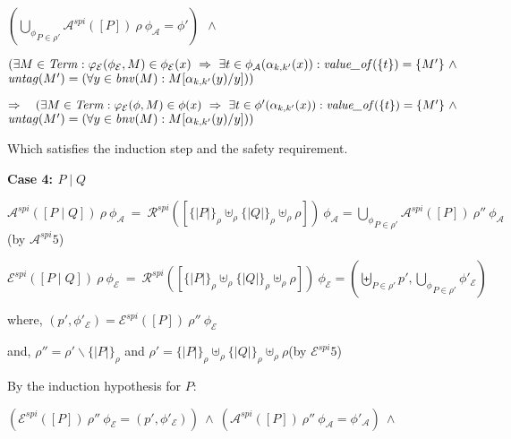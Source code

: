 \documentclass[10pt,a4paper,final,oneside,fleqn]{book}
\begin{document}
\noindent
$(\underset{P\in\rho'}{\bigcup_\phi}\mathcal{A}^{spi}(\![P]\!)~\rho~\phi_\mathcal{A}=\phi')~~\wedge$

\noindent
$(\exists M\in\mbox{{\itshape Term\/}}:\varphi_\mathcal{E}(\phi_\mathcal{E},M)\in\phi_\mathcal{E}(x)~\Rightarrow~\exists t\in\phi_\mathcal{A}(\alpha_{k,k'}(x)):\mbox{{\itshape value\_of\/}}(\{t\})=\{M'\}~\wedge$\\
$\mbox{{\itshape untag\/}}(M')=(\forall y\in\mbox{{\itshape bnv\/}}(M):M[\alpha_{k,k'}(y)/y]))$\vspace{5mm}

\noindent
$\Rightarrow~~~(\exists M\in\mbox{{\itshape Term\/}}:\varphi_\mathcal{E}(\phi,M)\in\phi(x)~\Rightarrow~\exists t\in\phi'(\alpha_{k,k'}(x)): \mbox{{\itshape value\_of\/}}(\{t\})=\{M'\}~\wedge$\\
$\mbox{{\itshape untag\/}}(M')=(\forall y\in\mbox{{\itshape bnv\/}}(M):M[\alpha_{k,k'}(y)/y]))$\vspace{5mm}

\noindent
Which satisfies the induction step and the safety requirement.\vspace{5mm}

\noindent
{\bf Case 4: $P\mid Q$}

\noindent
$\mathcal{A}^{spi}(\![P\mid Q]\!)~\rho~\phi_\mathcal{A}~=~\mathcal{R}^{spi}(\![\{\!|P|\!\}_\rho\uplus_\rho\{\!|Q|\!\}_\rho\uplus_\rho\rho]\!)~\phi_\mathcal{A}=\underset{P\in\rho'}{\bigcup_\phi}\mathcal{A}^{spi}(\![P]\!)~\rho''~\phi_\mathcal{A}$\hfill(by $\mathcal{A}^{{spi}}5$)

\noindent
$\mathcal{E}^{spi}(\![P\mid Q]\!)~\rho~\phi_\mathcal{E}~=~\mathcal{R}^{spi}(\![\{\!|P|\!\}_\rho\uplus_\rho\{\!|Q|\!\}_\rho\uplus_\rho\rho]\!)~\phi_\mathcal{E}=(\underset{P\in\rho'}{\biguplus}p',\underset{P\in\rho'}{\bigcup_\phi}\phi'_\mathcal{E})$

\noindent
where, $(p',\phi'_\mathcal{E})=\mathcal{E}^{spi}(\![P]\!)~\rho''~\phi_\mathcal{E}$

\noindent
and, $\rho''=\rho'\backslash\{\!|P|\!\}_\rho$ and $\rho'=\{\!|P|\!\}_\rho\uplus_\rho\{\!|Q|\!\}_\rho\uplus_\rho\rho$\hfill(by $\mathcal{E}^{{spi}}5$)\vspace{5mm}


\noindent
By the induction hypothesis for $P$:

\noindent
$(\mathcal{E}^{spi}(\![P]\!)~\rho''~\phi_{\mathcal{E}}=(p',\phi'_\mathcal{E}))~\wedge~(\mathcal{A}^{spi}(\![P]\!)~\rho''~\phi_{\mathcal{A}}=\phi'_\mathcal{A})~\wedge~$
\end{document}
